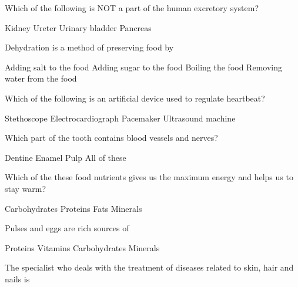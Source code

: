 \choice\choice\choice\choice\choice
\choice
\choice
\choice
\CorrectChoice\choice\choice\choice
\question Which of the following is NOT a part of the human excretory system?

\begin{randomizeoneparchoices}
    \choice Kidney
    \choice Ureter
    \choice Urinary bladder
    \CorrectChoice Pancreas
\end{randomizeoneparchoices}

\question Dehydration is a method of preserving food by \fillin

\begin{randomizechoices}
    \choice Adding salt to the food
    \choice Adding sugar to the food
    \choice Boiling the food
    \CorrectChoice Removing water from the food
\end{randomizechoices}

\question Which of the following is an artificial device used to regulate heartbeat?

\begin{randomizeoneparchoices}
    \choice Stethoscope
    \choice Electrocardiograph
    \CorrectChoice Pacemaker
    \choice Ultrasound machine
\end{randomizeoneparchoices}

\question Which part of the tooth contains blood vessels and nerves?

\begin{randomizeoneparchoices}
    \choice Dentine
    \choice Enamel
    \CorrectChoice Pulp
    \choice All of these
\end{randomizeoneparchoices}

\question Which of the these food nutrients gives us the maximum energy and helps us to stay warm?

\begin{randomizeoneparchoices}
    \choice Carbohydrates
    \choice Proteins
    \CorrectChoice Fats
    \choice Minerals
\end{randomizeoneparchoices}

\question Pulses and eggs are rich sources of \fillin[]

\begin{randomizeoneparchoices}
    \CorrectChoice Proteins
    \choice Vitamins
    \choice Carbohydrates
    \choice Minerals
\end{randomizeoneparchoices}

\question The specialist who deals with the treatment of diseases related to skin, hair and nails is \fillin

